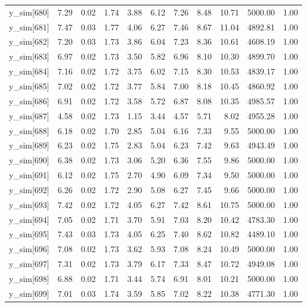\begin{table}[ht]
\begin{tabular}{rrrrrrrrrrr}
  y\_sim[680] & 7.29 & 0.02 & 1.74 & 3.88 & 6.12 & 7.26 & 8.48 & 10.71 & 5000.00 & 1.00 \\ 
  y\_sim[681] & 7.47 & 0.03 & 1.77 & 4.06 & 6.27 & 7.46 & 8.67 & 11.04 & 4892.81 & 1.00 \\ 
  y\_sim[682] & 7.20 & 0.03 & 1.73 & 3.86 & 6.04 & 7.23 & 8.36 & 10.61 & 4608.19 & 1.00 \\ 
  y\_sim[683] & 6.97 & 0.02 & 1.73 & 3.50 & 5.82 & 6.96 & 8.10 & 10.30 & 4899.70 & 1.00 \\ 
  y\_sim[684] & 7.16 & 0.02 & 1.72 & 3.75 & 6.02 & 7.15 & 8.30 & 10.53 & 4839.17 & 1.00 \\ 
  y\_sim[685] & 7.02 & 0.02 & 1.72 & 3.77 & 5.84 & 7.00 & 8.18 & 10.45 & 4860.92 & 1.00 \\ 
  y\_sim[686] & 6.91 & 0.02 & 1.72 & 3.58 & 5.72 & 6.87 & 8.08 & 10.35 & 4985.57 & 1.00 \\ 
  y\_sim[687] & 4.58 & 0.02 & 1.73 & 1.15 & 3.44 & 4.57 & 5.71 & 8.02 & 4955.28 & 1.00 \\ 
  y\_sim[688] & 6.18 & 0.02 & 1.70 & 2.85 & 5.04 & 6.16 & 7.33 & 9.55 & 5000.00 & 1.00 \\ 
  y\_sim[689] & 6.23 & 0.02 & 1.75 & 2.83 & 5.04 & 6.23 & 7.42 & 9.63 & 4943.49 & 1.00 \\ 
  y\_sim[690] & 6.38 & 0.02 & 1.73 & 3.06 & 5.20 & 6.36 & 7.55 & 9.86 & 5000.00 & 1.00 \\ 
  y\_sim[691] & 6.12 & 0.02 & 1.75 & 2.70 & 4.90 & 6.09 & 7.34 & 9.50 & 5000.00 & 1.00 \\ 
  y\_sim[692] & 6.26 & 0.02 & 1.72 & 2.90 & 5.08 & 6.27 & 7.45 & 9.66 & 5000.00 & 1.00 \\ 
  y\_sim[693] & 7.42 & 0.02 & 1.72 & 4.05 & 6.27 & 7.42 & 8.61 & 10.75 & 5000.00 & 1.00 \\ 
  y\_sim[694] & 7.05 & 0.02 & 1.71 & 3.70 & 5.91 & 7.03 & 8.20 & 10.42 & 4783.30 & 1.00 \\ 
  y\_sim[695] & 7.43 & 0.03 & 1.73 & 4.05 & 6.25 & 7.40 & 8.62 & 10.82 & 4489.10 & 1.00 \\ 
  y\_sim[696] & 7.08 & 0.02 & 1.73 & 3.62 & 5.93 & 7.08 & 8.24 & 10.49 & 5000.00 & 1.00 \\ 
  y\_sim[697] & 7.31 & 0.02 & 1.73 & 3.79 & 6.17 & 7.33 & 8.47 & 10.72 & 4949.08 & 1.00 \\ 
  y\_sim[698] & 6.88 & 0.02 & 1.71 & 3.44 & 5.74 & 6.91 & 8.01 & 10.21 & 5000.00 & 1.00 \\ 
  y\_sim[699] & 7.01 & 0.03 & 1.74 & 3.59 & 5.85 & 7.02 & 8.22 & 10.38 & 4771.30 & 1.00 \\ 

\end{tabular}
\end{table}
